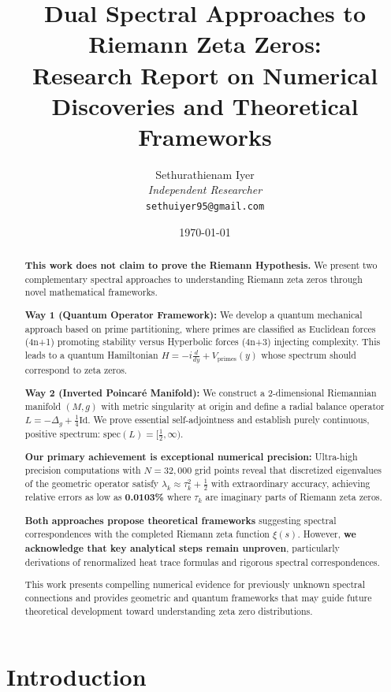 \documentclass[12pt]{article}
\title{\textbf{Dual Spectral Approaches to Riemann Zeta Zeros:\\ Research Report on Numerical Discoveries and Theoretical Frameworks}}
\author{
Sethurathienam Iyer\\
\textit{Independent Researcher}\\
\texttt{sethuiyer95@gmail.com}
}
\date{\today}
\begin{document}
\maketitle

\begin{abstract}
\textbf{This work does not claim to prove the Riemann Hypothesis.} We present two complementary spectral approaches to understanding Riemann zeta zeros through novel mathematical frameworks.

\textbf{Way 1 (Quantum Operator Framework):} We develop a quantum mechanical approach based on prime partitioning, where primes are classified as Euclidean forces (4n+1) promoting stability versus Hyperbolic forces (4n+3) injecting complexity. This leads to a quantum Hamiltonian $H = -i\frac{d}{dy} + V_{\text{primes}}(y)$ whose spectrum should correspond to zeta zeros.

\textbf{Way 2 (Inverted Poincaré Manifold):} We construct a 2-dimensional Riemannian manifold $(M, g)$ with metric singularity at origin and define a radial balance operator $L = -\Delta_g + \frac{1}{4}\text{Id}$. We prove essential self-adjointness and establish purely continuous, positive spectrum: $\text{spec}(L) = [\tfrac{1}{2}, \infty)$.

\textbf{Our primary achievement is exceptional numerical precision:} Ultra-high precision computations with $N = 32{,}000$ grid points reveal that discretized eigenvalues of the geometric operator satisfy $\lambda_k \approx \tau_k^2 + \frac{1}{2}$ with extraordinary accuracy, achieving relative errors as low as \textbf{0.0103\%} where $\tau_k$ are imaginary parts of Riemann zeta zeros.

\textbf{Both approaches propose theoretical frameworks} suggesting spectral correspondences with the completed Riemann zeta function $\xi(s)$. However, \textbf{we acknowledge that key analytical steps remain unproven}, particularly derivations of renormalized heat trace formulas and rigorous spectral correspondences.

This work presents compelling numerical evidence for previously unknown spectral connections and provides geometric and quantum frameworks that may guide future theoretical development toward understanding zeta zero distributions.
\end{abstract}

\section{Introduction}
\end{document}
